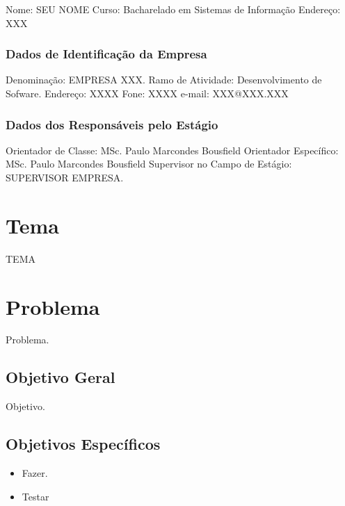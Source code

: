 		\medskip\hfill{\parbox{15cm}{
			\noindent Nome:  SEU NOME\newline
			Curso: Bacharelado em Sistemas de Informação\newline
			Endereço: XXX
		}

		\subsubsection{Dados de Identificação da Empresa}
		\medskip\hfill{\parbox{15cm}
		{
			\noindent Denominação: EMPRESA XXX.\newline
			Ramo de Atividade: Desenvolvimento de Sofware.\newline
			Endereço: XXXX \newline
			Fone: XXXX  e-mail: XXX@XXX.XXX
		}

		\subsubsection{Dados dos Responsáveis pelo Estágio}
		\medskip\hfill{\parbox{15cm}
		{
			\noindent Orientador de Classe:  MSc. Paulo Marcondes Bousfield \newline
			Orientador Específico:  MSc. Paulo Marcondes Bousfield \newline
			Supervisor no Campo de Estágio: SUPERVISOR EMPRESA.
		}
	
\section{Tema}

	TEMA
	
\section{Problema}

	Problema.
		
\subsection{Objetivo Geral}

	Objetivo.

\subsection{Objetivos Específicos}

	\begin{itemize}
		\item Fazer.
		\item Testar
	\end{itemize}
	
}}}
